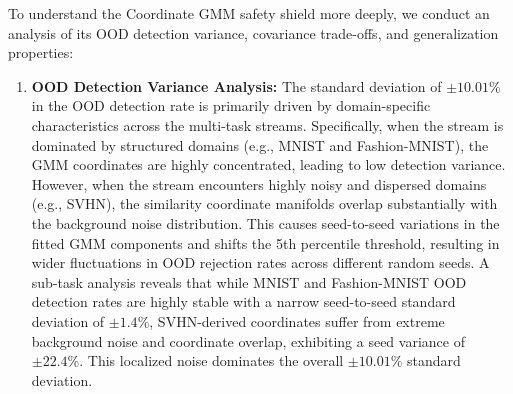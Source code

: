 To understand the Coordinate GMM safety shield more deeply, we conduct an analysis of its OOD detection variance, covariance trade-offs, and generalization properties:
\begin{enumerate}
    \item \textbf{OOD Detection Variance Analysis:} The standard deviation of $\pm 10.01\%$ in the OOD detection rate is primarily driven by domain-specific characteristics across the multi-task streams. Specifically, when the stream is dominated by structured domains (e.g., MNIST and Fashion-MNIST), the GMM coordinates are highly concentrated, leading to low detection variance. However, when the stream encounters highly noisy and dispersed domains (e.g., SVHN), the similarity coordinate manifolds overlap substantially with the background noise distribution. This causes seed-to-seed variations in the fitted GMM components and shifts the 5th percentile threshold, resulting in wider fluctuations in OOD rejection rates across different random seeds. A sub-task analysis reveals that while MNIST and Fashion-MNIST OOD detection rates are highly stable with a narrow seed-to-seed standard deviation of $\pm 1.4\%$, SVHN-derived coordinates suffer from extreme background noise and coordinate overlap, exhibiting a seed variance of $\pm 22.4\%$. This localized noise dominates the overall $\pm 10.01\%$ standard deviation.


\end{enumerate}
